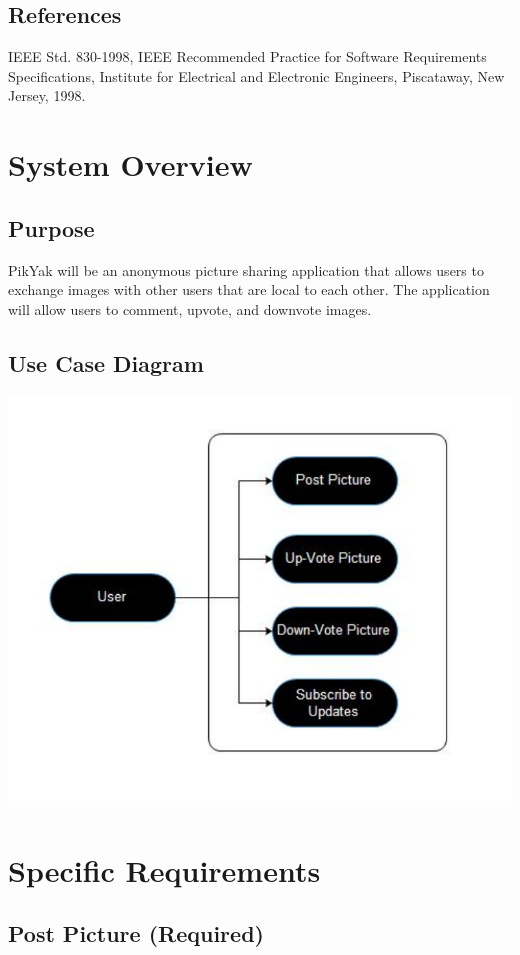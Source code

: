 \documentclass[11pt]{scrartcl}
\let\stdsection\section
\renewcommand\section{\newpage\stdsection}
\begin{document}
    \subsection{References}
        IEEE Std. 830-1998, IEEE Recommended Practice for Software Requirements Specifications, Institute for Electrical and Electronic Engineers, Piscataway, New Jersey, 1998.

\section{System Overview}
    \subsection{Purpose}
        PikYak will be an anonymous picture sharing application that allows users to exchange images with other users that are local to each other.  The application will allow users to comment, upvote, and downvote images.
    \subsection{Use Case Diagram}
        \includegraphics{useCase}

\section{Specific Requirements}
    \subsection{Post Picture (Required)}
\end{document}
